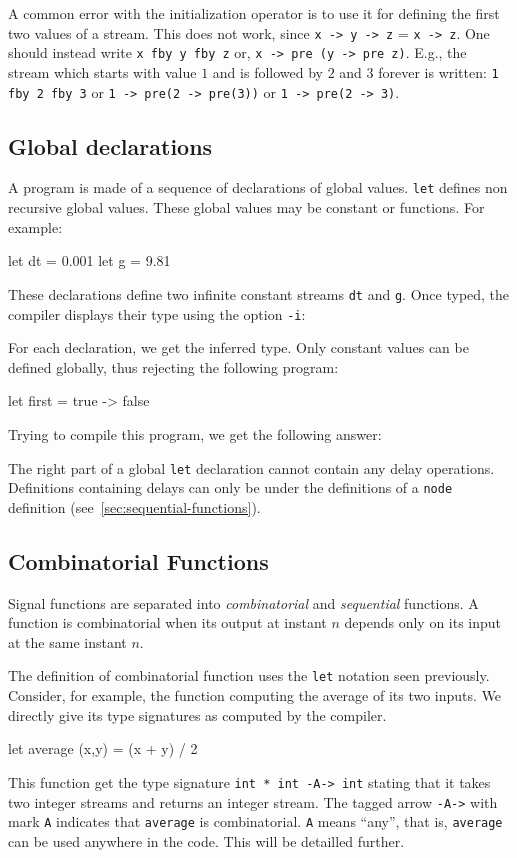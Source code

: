 \documentclass[11pt,titlepage,twoside]{report}
\newenvironment{sample}
  {\begin{flushright}\begin{minipage}[t]{15cm}\begin{alltt}}
  {\end{alltt}\end{minipage}\end{flushright}}
\begin{document}
\medskip{} A common error with the initialization
operator is to use it for defining the first two values of a
stream. This does not work, since \verb+x -> y -> z+ =
\verb+x -> z+. One should instead write \verb-x fby y fby z- or,
\verb+x -> pre (y -> pre z)+. E.g., the stream which starts with value
$1$ and is followed by $2$ and $3$ forever is written: \verb-1 fby 2 fby 3-
or \verb+1 -> pre(2 -> pre(3))+ or \verb+1 -> pre(2 -> 3)+.

\subsection{Global declarations}
A program is made of a sequence of declarations of global
values. \verb-let- defines non recursive global values. These global values may
be constant or functions. For example:
\begin{runverbatim}
let dt = 0.001
let g = 9.81
\end{runverbatim}
These declarations define two infinite constant streams \verb-dt- and
\verb-g-. Once typed, the compiler displays their type using the option {\tt -i}:
\begin{sample}\runverbatimcmd\end{sample}
\runverbatimmsg
For each declaration, we get the inferred type.
Only constant values can be defined globally, thus rejecting the
following program:
\begin{runverbatim}[fail]
let first = true -> false
\end{runverbatim}
Trying to compile this program, we get the following answer:
\begin{sample}\runverbatimcmd\end{sample}
\runverbatimerr
The right part of a global \verb-let- declaration cannot contain any
delay operations. Definitions containing delays can only be under the
definitions of a {\tt node} definition (see~\ref{sec:sequential-functions}).

\subsection{Combinatorial Functions}
Signal functions are separated into {\em combinatorial} and {\em
sequential} functions. A function is combinatorial when its output at
instant $n$ depends only on its input at the same instant $n$.

The definition of combinatorial function uses the {\tt let} notation
seen previously. Consider, for example, the function computing the
average of its two inputs. We directly give its type
signatures as computed by the compiler.
\begin{runverbatim}[withresult]
let average (x,y) = (x + y) / 2
\end{runverbatim}
This function get the type signature \verb+int * int -A-> int+ stating
that it takes two integer streams and returns an integer stream. The
tagged arrow \texttt{-A->} with mark \texttt{A} indicates that
\texttt{average} is combinatorial. \texttt{A} means ``any'', that is,
\texttt{average} can be used anywhere in the code. This will be
detailled further.
\end{document}
